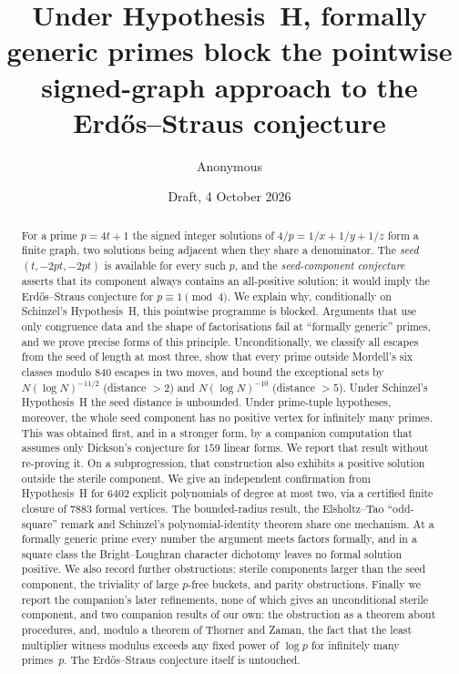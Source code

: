 \documentclass[11pt,reqno]{amsart}
\title[Formally generic primes and the signed graph of Erd\H{o}s--Straus]{Under Hypothesis~H, formally generic primes block the pointwise signed-graph approach to the Erd\H{o}s--Straus conjecture}
\author{Anonymous}
\date{Draft, 4 October 2026}
\theoremstyle{definition}
\begin{document}
\begin{abstract}
For a prime $p=4t+1$ the signed integer solutions of $4/p=1/x+1/y+1/z$
form a finite graph, two solutions being adjacent when they share a
denominator.  The \emph{seed} $(t,-2pt,-2pt)$ is available for every such
$p$, and the \emph{seed-component conjecture} asserts that its component
always contains an all-positive solution; it would imply the
Erd\H{o}s--Straus conjecture for $p\equiv1\pmod4$.  We explain why,
conditionally on Schinzel's Hypothesis~H, this pointwise programme is
blocked.  Arguments that use only congruence data
and the shape of factorisations fail at ``formally generic'' primes, and we
prove precise forms of this principle.  Unconditionally, we
classify all escapes from the seed of length at most three, show that every
prime outside Mordell's six classes modulo $840$ escapes in two moves, and
bound the exceptional sets by $N(\log N)^{-11/2}$ (distance $>2$) and
$N(\log N)^{-10}$ (distance $>5$).  Under Schinzel's Hypothesis~H the seed
distance is unbounded.  Under prime-tuple hypotheses, moreover, the whole
seed component has no positive vertex for infinitely many primes.  This
was obtained first, and in a stronger form, by a companion computation that
assumes only Dickson's conjecture for $159$ linear forms.  We report that
result without re-proving it.  On a
subprogression, that construction also exhibits a positive solution
outside the sterile component.  We give an independent
confirmation from Hypothesis~H for $6402$ explicit polynomials of degree at
most two, via a certified finite closure of $7883$ formal vertices.  The
bounded-radius result, the Elsholtz--Tao ``odd-square'' remark and
Schinzel's polynomial-identity theorem share one mechanism.  At a formally
generic prime every number the argument meets factors formally, and in a
square class the Bright--Loughran character dichotomy leaves no formal
solution positive.
We also record further obstructions: sterile components larger than the
seed component, the triviality of large $p$-free buckets, and parity
obstructions.  Finally we report the companion's later refinements, none of which gives
an unconditional sterile component, and two companion results of our own: the obstruction as a
theorem about procedures, and, modulo a theorem of Thorner and Zaman, the
fact that the least multiplier witness modulus exceeds any fixed power
of $\log p$ for infinitely many primes~$p$.  The Erd\H{o}s--Straus conjecture itself is
untouched.
\end{abstract}

\maketitle
\end{document}
